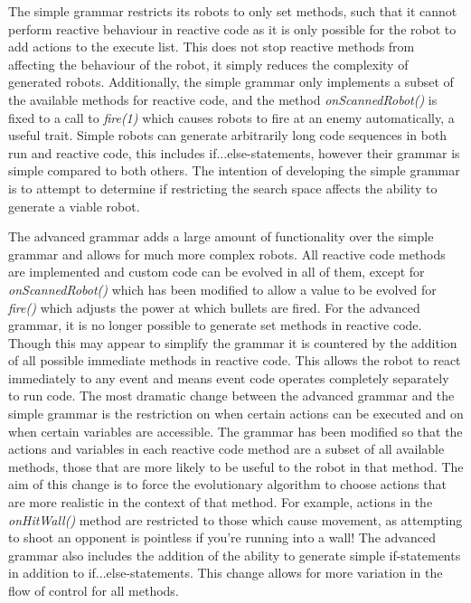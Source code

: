 \documentclass[a4paper, 12pt]{article}
\begin{document}
The simple grammar restricts its robots to only set methods, such that it cannot perform reactive behaviour in reactive code as it is only possible for the robot to add actions to the execute list. This does not stop reactive methods from affecting the behaviour of the robot, it simply reduces the complexity of generated robots. Additionally, the simple grammar only implements a subset of the available methods for reactive code, and the method \textit{onScannedRobot()} is fixed to a call to \textit{fire(1)} which causes robots to fire at an enemy automatically, a useful trait. Simple robots can generate arbitrarily long code sequences in both run and reactive code, this includes if...else-statements, however their grammar is simple compared to both others. The intention of developing the simple grammar is to attempt to determine if restricting the search space affects the ability to generate a viable robot. 

The advanced grammar adds a large amount of functionality over the simple grammar and allows for much more complex robots. All reactive code methods are implemented and custom code can be evolved in all of them, except for \textit{onScannedRobot()} which has been modified to allow a value to be evolved for \textit{fire()} which adjusts the power at which bullets are fired. For the advanced grammar, it is no longer possible to generate set methods in reactive code. Though this may appear to simplify the grammar it is countered by the addition of all possible immediate methods in reactive code. This allows the robot to react immediately to any event and means event code operates completely separately to run code. The most dramatic change between the advanced grammar and the simple grammar is the restriction on when certain actions can be executed and on when certain variables are accessible. The grammar has been modified so that the actions and variables in each reactive code method are a subset of all available methods, those that are more likely to be useful to the robot in that method. The aim of this change is to force the evolutionary algorithm to choose actions that are more realistic in the context of that method. For example, actions in the \textit{onHitWall()} method are restricted to those which cause movement, as attempting to shoot an opponent is pointless if you're running into a wall! The advanced grammar also includes the addition of the ability to generate simple if-statements in addition to if...else-statements. This change allows for more variation in the flow of control for all methods. 
\end{document}
